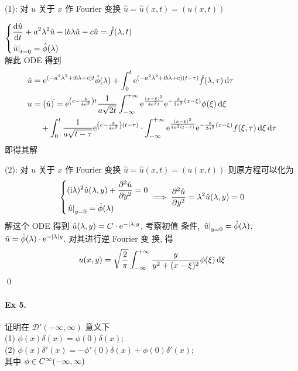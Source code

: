 \begin{solution}
(1): 对 $u$ 关于 $x$ 作 Fourier 变换 $\hat u=\hat u(x, t)=(u(x, t))^{\hat{}}$

$\begin{dcases}
{\frac{\operatorname{d\!}{\hat u}}{\operatorname{d\!}{t}}} +a^2\lambda^2\hat u -{\mathrm i} b\lambda\hat u -c\hat u
    =\hat f(\lambda, t) \\
{\left.{\hat u} \right|}_{t=0} = \hat\phi(\lambda)
\end{dcases}$\\
解此 ODE 得到
\begin{align*}
\hat u &= {\mathrm e}^{(-a^2\lambda^2 + {\mathrm i} b \lambda + c)t} \hat\phi(\lambda)
+ \int_0^t {\mathrm e}^{(-a^2\lambda^2 + {\mathrm i} b \lambda + c)(t - \tau)}
    \hat f(\lambda, \tau) \operatorname{d\!} \tau \\
u &= (\hat u)^{\check{}}
= {\mathrm e}^{{\left( {c-\frac{b}{4a^2}} \right)}t} \frac1{a\sqrt{2t}}
    \int_{-\infty}^{+\infty} {\mathrm e}^{\frac{(x - \xi)^2}{4a^2t}}
    {\mathrm e}^{-\frac{b}{2a^2}(x-\xi)} \phi(\xi) \operatorname{d\!} \xi \\
&\quad+ \int_0^{t} \frac1{a\sqrt{t-\tau}}
    {\mathrm e}^{{\left( {c-\frac{b}{4a^2}} \right)}(t-\tau)} 
    \cdot \int_{-\infty}^{+\infty}
	    {\mathrm e}^{\frac{(x - \xi)^2}{4a^2(t-\tau)}}
        {\mathrm e}^{-\frac{b}{2a^2}(x-\xi)} f(\xi, \tau) \operatorname{d\!} \xi \operatorname{d\!} \tau
\end{align*}
即得其解

\noindent (2): 对 $u$ 关于 $x$ 作 Fourier 变换
$\hat u = \hat u(x, t) = (u(x, t))^{\hat{}}$ 则原方程可以化为
\[ {\left\{ \begin{aligned} 
& ({\mathrm i}\lambda)^2 \hat u(\lambda, y)	+ {\frac{\partial {^2\hat u}}{\partial {y^2}}} = 0 \\
& {\left.{\hat u} \right|}_{y=0} = \hat \phi(\lambda)
 \end{aligned} \right.} \implies {\frac{\partial {^2\hat u}}{\partial {y^2}}} = \lambda^2\hat u(\lambda, y) = 0\]
解这个 ODE 得到 $\hat u(\lambda, y) = C \cdot {\mathrm e}^{-{\lvert {\lambda} \rvert} y}$, 考察初值
条件, ${\left.{\hat u} \right|}_{y=0} = \hat\phi(\lambda)$,
$\hat u = \hat\phi(\lambda) \cdot {\mathrm e}^{-{\lvert {\lambda} \rvert}y}$. 对其进行逆 Fourier 变
换, 得
\[
u(x, y) = \sqrt{\frac{2}{\pi}} \int_{-\infty}^{+\infty} \frac{y}{y^2+(x-\xi)^2}
\phi(\xi) \operatorname{d\!} \xi
\]
\qed
\end{solution}
\paragraph{Ex 5.}
证明在 $\mathcal D'(-\infty, \infty)$ 意义下 \\
(1) $\phi(x)\delta(x) = \phi(0)\delta(x)$; \\
(2) $\phi(x)\delta'(x) = -\phi'(0)\delta(x) + \phi(0)\delta'(x)$; \\
其中 $\phi \in C{^\infty(-\infty, \infty)}$

